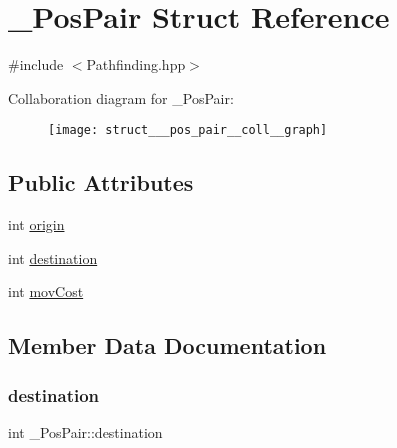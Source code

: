 \hypertarget{struct___pos_pair}{}\section{\+\_\+\+Pos\+Pair Struct Reference}
\label{struct___pos_pair}


{\ttfamily \#include $<$Pathfinding.\+hpp$>$}



Collaboration diagram for \+\_\+\+Pos\+Pair\+:
\nopagebreak
\begin{figure}[H]
\begin{center}
\leavevmode
\texttt{[image: struct\_\_\_pos\_pair\_\_coll\_\_graph]}
\end{center}
\end{figure}
\subsection*{Public Attributes}
\begin{DoxyCompactItemize}
\item 
int \mbox{\hyperlink{struct___pos_pair_a18ef19735976df84d1dda3185b844da0}{origin}}
\item 
int \mbox{\hyperlink{struct___pos_pair_a124d06bcfd8e7be752f9d32c0a7ce1bf}{destination}}
\item 
int \mbox{\hyperlink{struct___pos_pair_abf7f6970e1ace7a4f1cdc3179886e21d}{mov\+Cost}}
\end{DoxyCompactItemize}


\subsection{Member Data Documentation}
\mbox{\label{struct___pos_pair_a124d06bcfd8e7be752f9d32c0a7ce1bf}} 
\subsubsection{\texorpdfstring{destination}{destination}}
{\footnotesize\ttfamily int \+\_\+\+Pos\+Pair\+::destination}

\mbox{\label{struct___pos_pair_abf7f6970e1ace7a4f1cdc3179886e21d}} 

